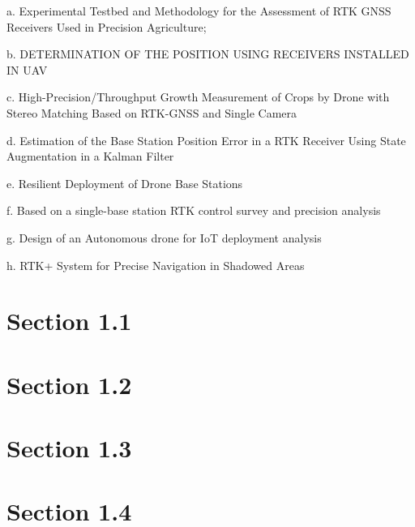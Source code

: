 a. Experimental Testbed and Methodology for the
Assessment of RTK GNSS Receivers Used
in Precision Agriculture;

b. DETERMINATION OF THE POSITION USING
RECEIVERS INSTALLED IN UAV

c. High-Precision/Throughput Growth Measurement of
Crops by Drone with Stereo Matching Based on
RTK-GNSS and Single Camera

d. Estimation of the Base Station Position Error in a
RTK Receiver Using State Augmentation in a
Kalman Filter

e. Resilient Deployment of Drone Base Stations

f. Based on a single-base station RTK control survey
and precision analysis 

g. Design of an Autonomous drone for IoT deployment
analysis 

h. RTK+ System for Precise Navigation in Shadowed
Areas 

\section{Section 1.1}\label{sub:sub1_1}

\section{Section 1.2}\label{sec:sub1_2}

\section{Section 1.3}\label{sec:sub1_3}

\section{Section 1.4}\label{sec:sub1_4}